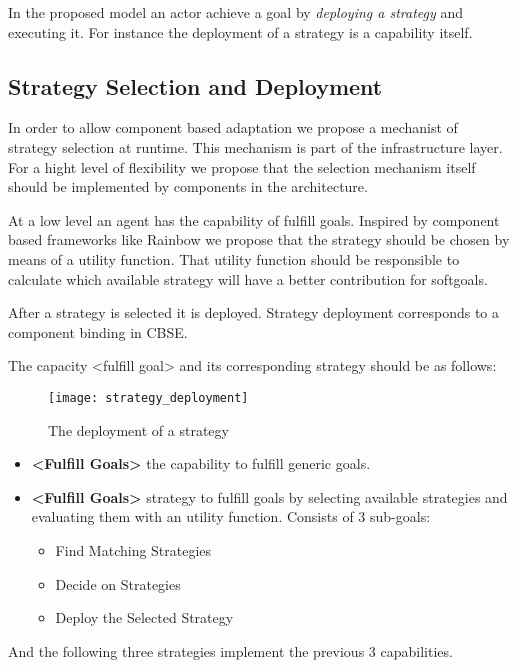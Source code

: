 In the proposed model an actor achieve a goal by \emph{deploying a strategy} and executing it. For instance the deployment of a strategy is a capability itself.

\subsection{Strategy Selection and Deployment}

In order to allow component based adaptation we propose a mechanist of strategy selection at runtime. This mechanism is part of the infrastructure layer. For a hight level of flexibility we propose that the selection mechanism itself should be implemented by components in the architecture.

At a low level an agent has the capability of fulfill goals. Inspired by component based frameworks like Rainbow\cite{garlan_rainbow:_2004} we propose that the strategy should be chosen by means of a utility function. That utility function should be responsible to calculate which available strategy will have a better contribution for softgoals.

After a strategy is selected it is deployed. Strategy deployment corresponds to a component binding in CBSE.

The capacity <fulfill goal> and its corresponding strategy should be as follows:

\begin{figure}
  \centering
  \texttt{[image: strategy\_deployment]}
  \caption{The deployment of a strategy}
  \label{fig:agent_composition}
\end{figure}

\begin{itemize}
\item \textbf{<Fulfill Goals>} the capability to fulfill generic goals.

\item \textbf{<Fulfill Goals>} strategy to fulfill goals by selecting available strategies and evaluating them with an utility function. Consists of 3 sub-goals:
  \begin{itemize}
    \item Find Matching Strategies
    \item Decide on Strategies
    \item Deploy the Selected Strategy
  \end{itemize}
\end{itemize}

And the following three strategies implement the previous 3 capabilities.

